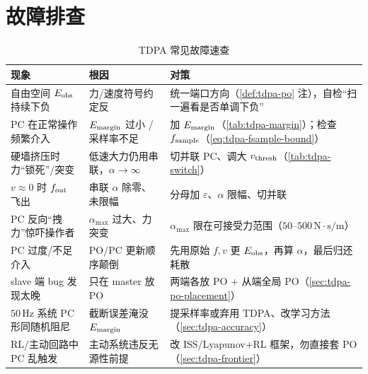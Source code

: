 \section{故障排查}
\label{sec:tdpa-troubleshoot}

\begin{table}[H]\centering\small
\caption{TDPA 常见故障速查}
\label{tab:tdpa-troubleshoot}
\begin{tabularx}{\linewidth}{p{} L L}
\toprule
现象 & 根因 & 对策 \\
\midrule
自由空间 $E_{\rm obs}$ 持续下负 & 力/速度符号约定反 & 统一端口方向（\cref{def:tdpa-po} 注），自检“扫一遍看是否单调下负” \\
PC 在正常操作频繁介入 & $E_{\rm margin}$ 过小 / 采样率不足 & 加 $E_{\rm margin}$（\cref{tab:tdpa-margin}）；检查 $f_{\rm sample}$（\cref{eq:tdpa-fsample-bound}） \\
硬墙挤压时力“锁死”/突变 & 低速大力仍用串联，$\alpha\to\infty$ & 切并联 PC、调大 $v_{\rm thresh}$（\cref{tab:tdpa-switch}） \\
$v\approx0$ 时 $f_{\rm out}$ 飞出 & 串联 $\alpha$ 除零、未限幅 & 分母加 $\varepsilon$、$\alpha$ 限幅、切并联 \\
PC 反向“拽力”惊吓操作者 & $\alpha_{\max}$ 过大、力突变 & $\alpha_{\max}$ 限在可接受力范围（$50$–$500\,\mathrm{N\cdot s/m}$） \\
PC 过度/不足介入 & PO/PC 更新顺序颠倒 & 先用原始 $f,v$ 更 $E_{\rm obs}$，再算 $\alpha$，最后归还耗散 \\
slave 端 bug 发现太晚 & 只在 master 放 PO & 两端各放 PO + 从端全局 PO（\cref{sec:tdpa-po-placement}） \\
$50\,\mathrm{Hz}$ 系统 PC 形同随机阻尼 & 截断误差淹没 $E_{\rm margin}$ & 提采样率或弃用 TDPA、改学习方法（\cref{sec:tdpa-accuracy}） \\
RL/主动回路中 PC 乱触发 & 主动系统违反无源性前提 & 改 ISS/Lyapunov+RL 框架，勿直接套 PO（\cref{sec:tdpa-frontier}） \\
\bottomrule
\end{tabularx}
\end{table}
